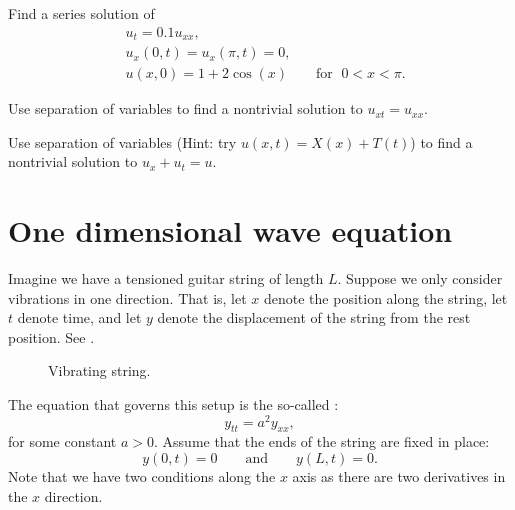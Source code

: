 
\begin{exercise}
Find a series solution of
\begin{align*}
& u_t =  0.1 u_{xx} , \\
& u_x(0,t) = u_x(\pi,t) = 0 , \\
& u(x,0) = 1 + 2\cos (x) \qquad \text{for } \; 0 < x < \pi .
\end{align*}
\end{exercise}

\begin{exercise}
Use separation of variables to find a nontrivial solution to
$u_{xt} = u_{xx}$.
\end{exercise}

\begin{exercise}
Use separation of variables (Hint: try $u(x,t) = X(x)+T(t)$)
to find a nontrivial solution to
$u_{x} + u_{t} = u$.
\end{exercise}


\sectionnewpage
\section{One dimensional wave equation} \label{we:section}


Imagine we have a tensioned guitar string of length $L$.  Suppose we
only consider vibrations in one direction.  That is, let
$x$ denote the position along the string, let $t$ denote time, and let $y$
denote the displacement of the string from the rest position.
See
.

\begin{figure}[h!t]
\capstart
\begin{center}
\caption{Vibrating string.\label{we:vibstrfig}}
\end{center}
\end{figure}

The equation that governs this setup is the so-called
\emph{}:
\begin{equation*}
\boxed{~~
y_{tt} =
a^2 y_{xx} ,
~~}
\end{equation*}
for some constant $a > 0$.
Assume that the ends of the string are fixed in place:
\begin{equation*}
y(0,t) = 0 \qquad \text{and} \qquad y(L,t) = 0.
\end{equation*}
Note that we have two conditions along the $x$ axis as there are
two derivatives in the $x$ direction.

